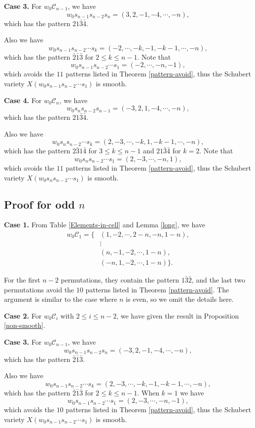 \documentclass[11pt, reqno]{amsart}
\theoremstyle{definition}
\numberwithin{equation}{section}
\begin{document}
{\bf Case 3.} For $ w_0\mathcal{C}_{n-1}$, we have
   $$ w_0s_{n-1}s_{n-2}s_n=(3,2,-1,-4,\cdots,-n),$$
which has the pattern $21\bar{3}\bar{4}$.

Also we have $$w_0s_{n-1}s_{n-2}\cdots s_k=(-2,\cdots,-k,-1,-k-1,\cdots,-n),$$
which has the pattern $\bar{2}\bar{1}\bar{3}$ for $2\leq k\leq n-1$. Note that $$w_0s_{n-1}s_{n-2}\cdots s_1=(-2,\cdots,-n,-1),$$ which avoids the $11$ patterns listed in Theorem \ref{pattern-avoid}, thus the Schubert variety $X(w_0s_{n-1}s_{n-2}\cdots s_1)$ is smooth.

{\bf Case 4.} For $w_0\mathcal{C}_{n}$, we have
   $$ w_0s_ns_{n-2}s_{n-1}=(-3,2,1,-4,\cdots,-n),$$
which has the pattern $21\bar{3}\bar{4}$.

Also we have $$w_0s_{n}s_{n-2}\cdots s_k=(2,-3,\cdots,-k,1,-k-1,\cdots,-n),$$
which has the pattern $2\bar{3}1\bar{4}$ for $3\leq k\leq n-1$ and $21\bar{3}\bar{4}$ for $k=2$. Note that $$w_0s_{n}s_{n-2}\cdots s_1=(2,-3,\cdots,-n,1),$$ which avoids the $11$ patterns listed in Theorem \ref{pattern-avoid}, thus the Schubert variety $X(w_0s_{n}s_{n-2}\cdots s_1)$ is smooth.

\subsection{Proof for odd $n$}

{\bf Case 1.} From Table \ref{Elements-in-cell} and Lemma \ref{long}, we have 
\begin{align*}
    w_0\mathcal{C}_1=\{&(1,-2,\cdots,2-n,-n,1-n),\\
	&\vdots\\
    &(n,-1,-2,\cdots,1-n),\\
	&(-n,1,-2,\cdots,1-n)\}.
\end{align*}

For the first $n-2$ permutations, they contain the pattern $1\bar{3}\bar{2}$, and the last two permutations avoid the $10$ patterns listed in Theorem \ref{pattern-avoid}. The argument is similar to the case where $n$ is even, so we omit the details here.

{\bf Case 2.} For $ w_0\mathcal{C}_{i}$ with $2\leq i\leq n-2$, we have given the result in
Proposition \ref{non-smooth}.

{\bf Case 3.} For $ w_0\mathcal{C}_{n-1}$, we have
   $$ w_0s_{n-1}s_{n-2}s_n=(-3,2,-1,-4,\cdots,-n),$$
which has the pattern $\bar{2}\bar{1}\bar{3}$.

Also we have $$w_0s_{n-1}s_{n-2}\cdots s_k=(2,-3,\cdots,-k,-1,-k-1,\cdots,-n),$$
which has the pattern $\bar{2}\bar{1}\bar{3}$ for $2\leq k\leq n-1$. When $k=1$ we have $$w_0s_{n-1}s_{n-2}\cdots s_1=(2,-3,\cdots,-n,-1),$$ which avoids the $10$ patterns listed in Theorem \ref{pattern-avoid}, thus the Schubert variety $X(w_0s_{n-1}s_{n-2}\cdots s_1)$ is smooth.
\end{document}
